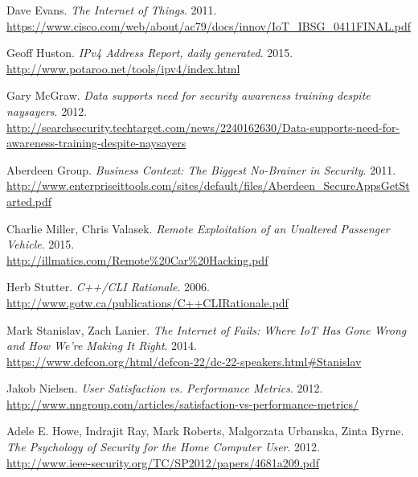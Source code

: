 \documentclass[a4paper,12pt]{article}
\begin{document}
	\begingroup
	\renewcommand{\section}[2]{}
	\begin{thebibliography}{}
		
		Dave Evans. \textit{The Internet of Things}. 2011.\\ \url{https://www.cisco.com/web/about/ac79/docs/innov/IoT\_IBSG\_0411FINAL.pdf}
		
		Geoff Huston. \textit{IPv4 Address Report, daily generated}. 2015.\\
		\url{http://www.potaroo.net/tools/ipv4/index.html}
		
		Gary McGraw. \textit{Data supports need for security awareness training despite naysayers}. 2012.\\
		\url{http://searchsecurity.techtarget.com/news/2240162630/Data-supports-need-for-awareness-training-despite-naysayers}
		
		Aberdeen Group. \textit{Business Context: The Biggest No-Brainer in Security}. 2011.\\
		\url{http://www.enterpriseittools.com/sites/default/files/Aberdeen_SecureAppsGetStarted.pdf}
		
		Charlie Miller, Chris Valasek. \textit{Remote Exploitation of an Unaltered Passenger Vehicle}. 2015.\\
		\url{http://illmatics.com/Remote%20Car%20Hacking.pdf}
		
		Herb Stutter. \textit{C++/CLI Rationale}. 2006.\\
		\url{http://www.gotw.ca/publications/C++CLIRationale.pdf}
		
		Mark Stanislav, Zach Lanier. \textit{The Internet of Fails: Where IoT Has Gone Wrong and How We're Making It Right}. 2014.\\
		\url{https://www.defcon.org/html/defcon-22/dc-22-speakers.html#Stanislav}
		
		Jakob Nielsen. \textit{User Satisfaction vs. Performance Metrics}. 2012.\\
		\url{http://www.nngroup.com/articles/satisfaction-vs-performance-metrics/}
		
		Adele E. Howe, Indrajit Ray, Mark Roberts, Malgorzata Urbanska, Zinta Byrne. \textit{The Psychology of Security for the Home Computer User}. 2012.\\
		\url{http://www.ieee-security.org/TC/SP2012/papers/4681a209.pdf}
		

\end{thebibliography}
\end{document}
